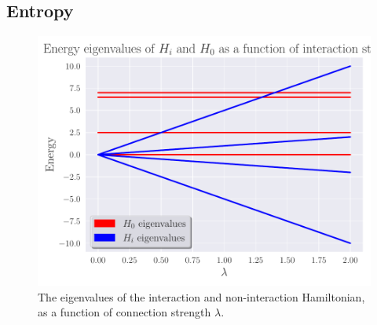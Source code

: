 \subsection{Entropy}
\begin{figure}
    \centering
    \includegraphics[scale=0.5]{figs/Eig_lmd.pdf}
    \caption{The eigenvalues of the interaction and non-interaction Hamiltonian, as a function of connection strength $\lambda$.}
    \label{fig:eig_lmd}
\end{figure}
